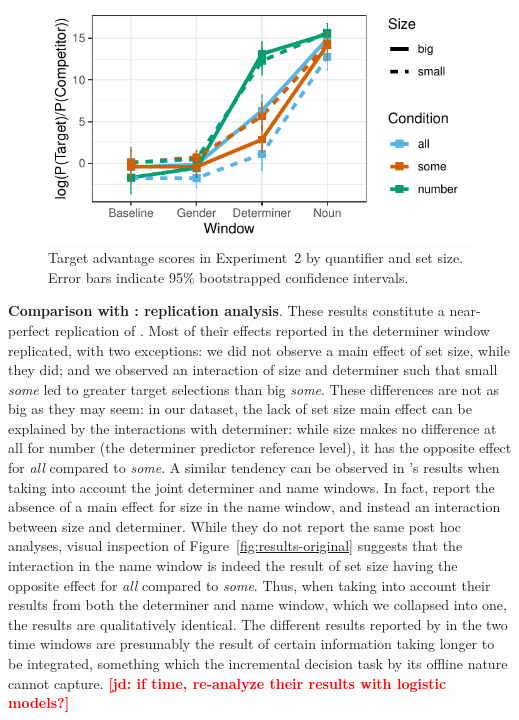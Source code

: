 \documentclass[10pt,letterpaper]{article}
\newcommand{\figref}[1]{Figure~\ref{#1}}
\newcommand{\expref}[1]{Experiment~#1}
\newcommand{\jd}[1]{\textcolor{Red}{\textbf{[jd: #1]}}}
\begin{document}
\begin{figure}[H]
\centering
\includegraphics[width=\columnwidth]{../../analysis/SunBreheny/1_incremental/main/graphs/results-idt}
\caption{Target advantage scores in \expref{2} by quantifier and set size. Error bars indicate 95\% bootstrapped confidence intervals.} 
\label{fig:results-idt}
\end{figure}

\textbf{Comparison with : replication analysis}. These results constitute a near-perfect replication of  . Most of their effects reported in the determiner window replicated, with two exceptions: we did not observe a main effect of set size, while they did; and we observed an interaction of size and determiner such that small \emph{some} led to greater target selections than big \emph{some}. These differences are not as big as they may seem: in our dataset, the lack of set size main effect can be explained by the interactions with determiner: while size makes no difference at all for number (the determiner predictor reference level), it has the opposite effect for \emph{all} compared to \emph{some}. A similar tendency can be observed in  's results when taking into account the joint determiner and name windows. In fact,   report the absence of a main effect for size in the name window, and instead an interaction between size and determiner. While they do not report the same post hoc analyses, visual inspection of \figref{fig:results-original} suggests that the interaction in the name window is indeed the result of set size having the opposite effect for \emph{all} compared to \emph{some}. Thus, when taking into account their results from both the determiner and name window, which we collapsed into one, the results are qualitatively identical. The different results reported by   in the two time windows are presumably the result of certain information taking longer to be integrated, something which the incremental decision task by its offline nature cannot capture. \jd{if time, re-analyze their results with logistic models?}
\end{document}
